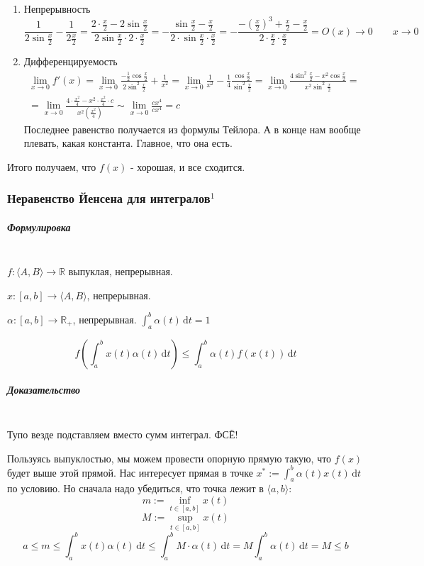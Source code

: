 \documentclass{article}
\def\D{\,\mathrm{d}}
\let\vanillasubparagraph\subparagraph
\renewcommand{\subparagraph}[1]{\vanillasubparagraph{#1}\mbox{}\\}
\begin{document}
\begin{enumerate}
    \item Непрерывность
        $$
        \frac{1}{2\sin{\frac{x}{2}}} - \frac{1}{2\frac{x}{2}} = \frac{2 \cdot \frac{x}{2} - 2\sin{\frac{x}{2}}}{2\sin{\frac{x}{2}} \cdot 2 \cdot \frac{x}{2}} = - \frac{\sin{\frac{x}{2}} - \frac{x}{2}} {2 \cdot \sin{\frac{x}{2}} \cdot \frac{x}{2}} = - \frac{- \left(\frac{x}{2}\right)^3 + \frac{x}{2} - \frac{x}{2}} {2 \cdot \frac{x}{2} \cdot \frac{x}{2}} = O(x) \to 0 \qquad x \to 0
        $$
    \item Дифференцируемость
        \begin{multline*}
            \lim_{x\to 0} f'(x) = \lim_{x\to 0} \frac{- \frac{1}{2} \cos{\frac{x}{2}}} {2\sin^2\frac{x}{2}} + \frac{1}{x^2} = \lim_{x\to 0} \frac{1}{x^2} - \frac{1}{4} \frac{\cos{\frac{x}{2}}} {\sin^2{\frac{x}{2}}} = \lim_{x\to 0} \frac{4\sin^2{\frac{x}{2}} - x^2 \cos{\frac{x}{2}}}{x^2 \sin^2{\frac{x}{2}}} = \\ = \lim_{x\to 0} \frac{4 \cdot \frac{x^2}{4} - x^2 \cdot \frac{x^2}{4} \cdot c}{x^2\left(\frac{x^2} {4}\right)} \sim \lim_{x\to 0} \frac{c x^4}{c x^4}  = c
        \end{multline*}
        Последнее равенство получается из формулы Тейлора. А в конце нам вообще плевать, какая константа. Главное, что она есть.
\end{enumerate}

Итого получаем, что $f(x)$ - хорошая, и все сходится.

\subsubsection{Неравенство Йенсена для интегралов\texorpdfstring{$^1$}{}}
\subparagraph{Формулировка}
$f: \langle A, B \rangle \rightarrow \mathbb{R}$ выпуклая, непрерывная.

$x: [a, b] \rightarrow \langle A, B \rangle$, непрерывная.

$\alpha: [a, b] \rightarrow \mathbb{R}_+$, непрерывная. $\int_a^b \alpha(t) \D t = 1$

$$
f(\int_a^b x(t) \alpha(t) \D t) \le \int_a^b \alpha(t) f(x(t)) \D t
$$


\subparagraph{Доказательство}
Тупо везде подставляем вместо сумм интеграл. ФСЁ!


Пользуясь выпуклостью, мы можем провести опорную прямую такую, что $f(x)$ будет выше этой прямой. Нас интересует прямая в точке $x^* := \int_a^b \alpha(t) x(t) \D t$ по условию. Но сначала надо убедиться, что точка лежит в $\langle a, b \rangle$:
$$
m := \inf_{t\in [a, b]} x(t)
$$
$$
M := \sup_{t\in [a, b]} x(t)
$$
$$
a \le m \le \int_a^b x(t) \alpha(t) \D t \le \int_a^b M \cdot \alpha(t) \D t = M \int_a^b \alpha(t) \D t = M \le b
$$
\end{document}

